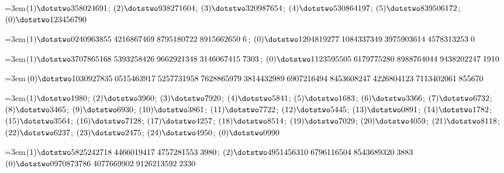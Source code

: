 \par\noindent\hangindent=3em\enspace $(1)\dotstwo358024691$; $(2)\dotstwo938271604$; $(3)\dotstwo320987654$; $(4)\dotstwo530864197$; $(5)\dotstwo839506172$; $(0)\dotstwo123456790$\par\smallskip

\par\noindent\hangindent=3em\enspace $(1)\dotstwo0240963855\;\allowbreak 4216867469\;\allowbreak 8795180722\;\allowbreak 8915662650\;\allowbreak 6$; $(0)\dotstwo1204819277\;\allowbreak 1084337349\;\allowbreak 3975903614\;\allowbreak 4578313253\;\allowbreak 0$\par\smallskip

\par\noindent\hangindent=3em\enspace $(1)\dotstwo3707865168\;\allowbreak 5393258426\;\allowbreak 9662921348\;\allowbreak 3146067415\;\allowbreak 7303$; $(0)\dotstwo1123595505\;\allowbreak 6179775280\;\allowbreak 8988764044\;\allowbreak 9438202247\;\allowbreak 1910$\par\smallskip

\par\noindent\hangindent=3em\enspace $(0)\dotstwo1030927835\;\allowbreak 0515463917\;\allowbreak 5257731958\;\allowbreak 7628865979\;\allowbreak 3814432989\;\allowbreak 6907216494\;\allowbreak 8453608247\;\allowbreak 4226804123\;\allowbreak 7113402061\;\allowbreak 855670$\par\smallskip

\par\noindent\hangindent=3em\enspace $(1)\dotstwo1980$; $(2)\dotstwo3960$; $(3)\dotstwo7920$; $(4)\dotstwo5841$; $(5)\dotstwo1683$; $(6)\dotstwo3366$; $(7)\dotstwo6732$; $(8)\dotstwo3465$; $(9)\dotstwo6930$; $(10)\dotstwo3861$; $(11)\dotstwo7722$; $(12)\dotstwo5445$; $(13)\dotstwo0891$; $(14)\dotstwo1782$; $(15)\dotstwo3564$; $(16)\dotstwo7128$; $(17)\dotstwo4257$; $(18)\dotstwo8514$; $(19)\dotstwo7029$; $(20)\dotstwo4059$; $(21)\dotstwo8118$; $(22)\dotstwo6237$; $(23)\dotstwo2475$; $(24)\dotstwo4950$; $(0)\dotstwo0990$\par\smallskip

\par\noindent\hangindent=3em\enspace $(1)\dotstwo5825242718\;\allowbreak 4466019417\;\allowbreak 4757281553\;\allowbreak 3980$; $(2)\dotstwo4951456310\;\allowbreak 6796116504\;\allowbreak 8543689320\;\allowbreak 3883$ $(0)\dotstwo0970873786\;\allowbreak 4077669902\;\allowbreak 9126213592\;\allowbreak 2330$\par\smallskip

\par\endgroup
